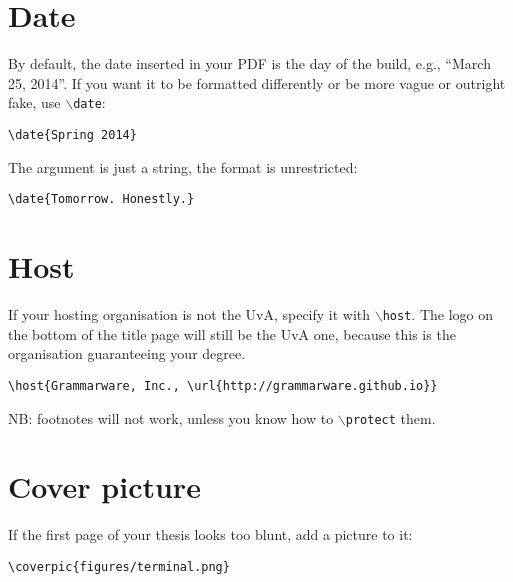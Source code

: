 \documentclass{uvamscse}
\newcommand{\cmd}[1]{\texttt{$\backslash$#1}}
\begin{document}
\section{Date}

By default, the date inserted in your PDF is the day of the build, e.g., ``March 25, 2014''. If you want it to be formatted differently or be more vague or outright fake, use \cmd{date}:

\begin{snippet}
\begin{verbatim}
\date{Spring 2014}
\end{verbatim}
\end{snippet}

The argument is just a string, the format is unrestricted:

\begin{snippet}
\begin{verbatim}
\date{Tomorrow. Honestly.}
\end{verbatim}
\end{snippet}

\section{Host}

If your hosting organisation is not the UvA, specify it with \cmd{host}. The
logo on the bottom of the title page will still be the UvA one, because this
is the organisation guaranteeing your degree.

\begin{snippet}
\begin{verbatim}
\host{Grammarware, Inc., \url{http://grammarware.github.io}}
\end{verbatim}
\end{snippet}

NB: footnotes will not work, unless you know how to \cmd{protect} them.

\section{Cover picture}

If the first page of your thesis looks too blunt, add a picture to it:

\begin{snippet}
\begin{verbatim}
\coverpic{figures/terminal.png}
\end{verbatim}
\end{snippet}
\end{document}
